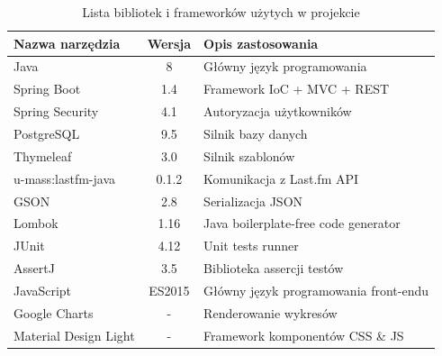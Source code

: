 \documentclass[openright]{xmgr}
\begin{document}
\begin{table}[h]
\begin{tabular}{|l|c|l|}
	\hline
	Nazwa narzędzia & Wersja & Opis zastosowania \\
	\hline
	Java & 8 & Główny język programowania \\
	\hline
	Spring Boot & 1.4 & Framework IoC + MVC + REST \\
    \hline
	Spring Security & 4.1 & Autoryzacja użytkowników \\
	\hline
	PostgreSQL & 9.5 & Silnik bazy danych \\
	\hline
	Thymeleaf & 3.0 & Silnik szablonów \\
	\hline
	u-mass:lastfm-java & 0.1.2 & Komunikacja z Last.fm API \\
	\hline
	GSON & 2.8 & Serializacja JSON \\
	\hline
	Lombok & 1.16 & Java boilerplate-free code generator \\
	\hline
	JUnit & 4.12 & Unit tests runner \\
	\hline
	AssertJ & 3.5 & Biblioteka assercji testów \\
	\hline
    JavaScript & ES2015 & Główny język programowania front-endu \\
    \hline
    Google Charts & - & Renderowanie wykresów \\
    \hline
    Material Design Light & - & Framework komponentów CSS \& JS \\
    \hline
\end{tabular}
    \caption{Lista bibliotek i frameworków użytych w projekcie}
	\label{tools-used}
\end{table}





\listoftables

\listoffigures

\oswiadczenie
\end{document}
